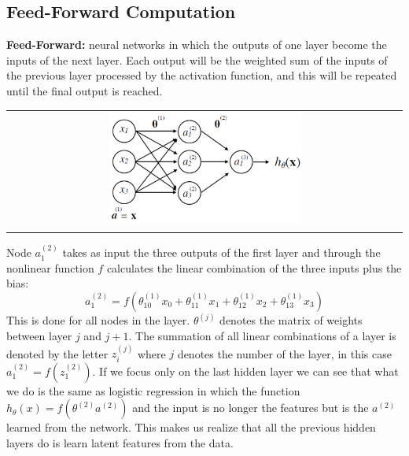 \subsection{Feed-Forward Computation}
\begin{mdframed}
    \textbf{Feed-Forward:} neural networks in which the outputs of one layer become the inputs of the next layer.   Each output will be the weighted sum of the inputs of the previous layer processed by the activation function, and this will be repeated until the final output is reached.
\end{mdframed}
\begin{center}
    \begin{tabular}{c}
        \\ \includegraphics[width=0.5\textwidth]{images/NeuralNetworks3.png} \\ \\
    \end{tabular}
\end{center}
Node $a_1^{(2)}$ takes as input the three outputs of the first layer and through the nonlinear function $f$ calculates the linear combination of the three inputs plus the bias:
\begin{equation} \tag*{}
    a_1^{(2)} = f(\theta_{10}^(1)x_0 + \theta_{11}^(1)x_1 + \theta_{12}^(1)x_2 + \theta_{13}^(1)x_3)
\end{equation}
This is done for all nodes in the layer.
$\theta^{(j)}$ denotes the matrix of weights between layer $j$ and $j+1$.
The summation of all linear combinations of a layer is denoted by the letter $z_i^{(j)}$ where $j$ denotes the number of the layer, in this case $a_1^{(2)} = f(z_1^{(2)})$.
If we focus only on the last hidden layer we can see that what we do is the same as logistic regression in which the function $h_\theta(x) =f(\theta^{(2)}a^{(2)})$ and the input is no longer the features but is the $a^{(2)}$ learned from the network.
This makes us realize that all the previous hidden layers do is learn latent features from the data.





\newpage